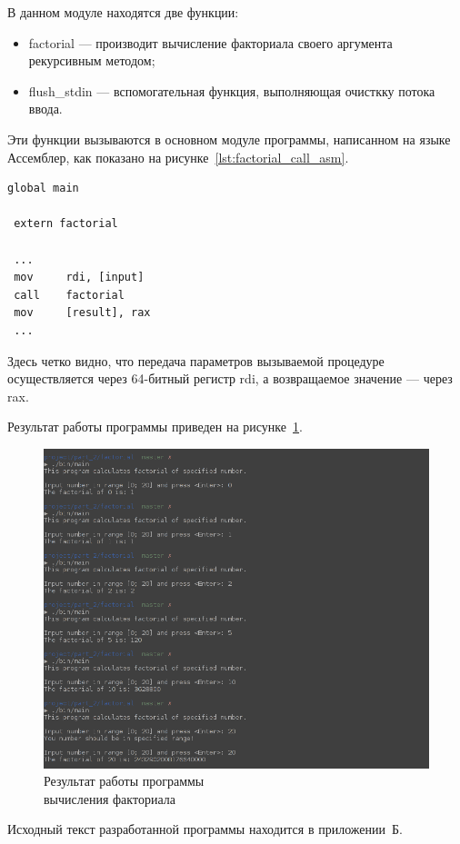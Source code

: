 В данном модуле находятся две функции:
\begin{itemize}
\item factorial --- производит вычисление факториала своего аргумента рекурсивным методом;
\item flush\_stdin --- вспомогательная функция, выполняющая очисткку потока ввода.
\end{itemize}

Эти функции вызываются в основном модуле программы, написанном на языке Ассемблер, 
как показано на рисунке~\ref{lst:factorial_call_asm}.

\begin{lstlisting}[caption=Вызов процедуры вычисления факториала,
label=lst:factorial_call_asm,language={[x86masm]Assembler},basicstyle=\scriptsize\ttfamily]
 global main
     
 extern factorial

 ...
 mov     rdi, [input]
 call    factorial
 mov     [result], rax
 ...
\end{lstlisting}

Здесь четко видно, что передача параметров вызываемой процедуре осуществляется через 64-битный
регистр rdi, а возвращаемое значение --- через rax.

Результат работы программы приведен на рисунке~\ref{pic:part_2}.

\begin{figure}[h!]
  \centering
  \includegraphics[width=0.8\linewidth]{pic/part_2}
  \caption{Результат работы программы \\ вычисления факториала}
  \label{pic:part_2}
\end{figure}

Исходный текст разработанной программы находится в приложении~Б.
